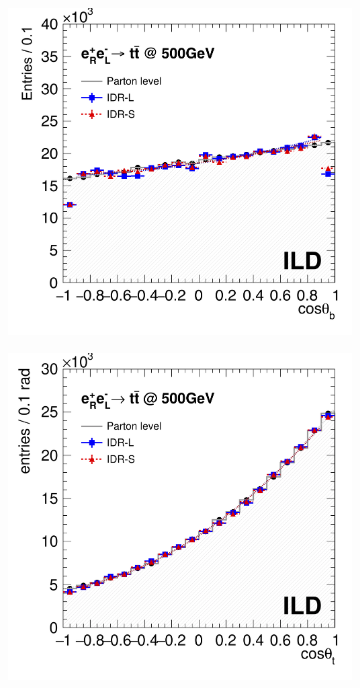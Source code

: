 \begin{figure}[htbp]
\begin{subfigure}{0.475\hsize} 
\includegraphics[width=\textwidth]{Performance/fig/b_1-modif.png}
 \caption{ \label{fig:ttbar:costhetabRL}}
 \end{subfigure}
\begin{subfigure}{0.475\hsize} 
\includegraphics[width=\textwidth]{Performance/fig/t_1-modif.png}

\end{subfigure}
\end{figure}
